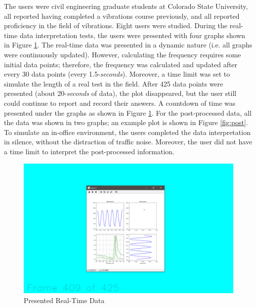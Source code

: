 \documentclass{sigchi}
\begin{document}
The users were civil engineering graduate students at Colorado State University, all reported having completed a vibrations course previously, and all reported proficiency in the field of vibrations. Eight users were studied. During the real-time data interpretation tests, the users were presented with four graphs shown in Figure \ref{fig:rt}. The real-time data was presented in a dynamic nature (i.e. all graphs were continuously updated). However, calculating the frequency requires some initial data points; therefore, the frequency was calculated and updated after every 30 data points (every 1.5-\textit{seconds}). Moreover, a time limit was set to simulate the length of a real test in the field. After 425 data points were presented (about 20-\textit{seconds} of data), the plot disappeared, but the user still could continue to report and record their answers. A countdown of time was presented under the graphs as shown in Figure \ref{fig:rt}. For the post-processed data, all the data was shown in two graphs; an example plot is shown in Figure \ref{fig:post}. To simulate an in-office environment, the users completed the data interpretation in silence, without the distraction of traffic noise. Moreover, the user did not have a time limit to interpret the post-processed information. 

\begin{figure}[ht]
    \centering
    \includegraphics[width=\columnwidth]{Figures/RT2.PNG}
    \caption{Presented Real-Time Data}
    \label{fig:rt}
\end{figure}
\end{document}
